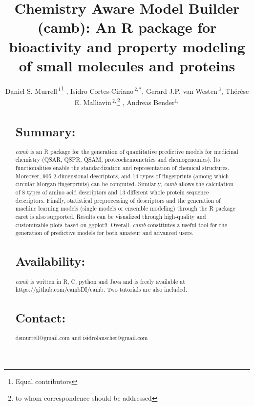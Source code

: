 \documentclass{bioinfo}
\begin{document}

\title{Chemistry Aware Model Builder (camb): An R package for bioactivity and property modeling of small molecules and proteins}
\author[Murrell \& Cortes-Ciriano \it{et~al}]{Daniel S. Murrell\,$^{1}$\footnote{Equal contributors} , Isidro Cortes-Ciriano\,$^{2,*}$, Gerard J.P. van Westen\,$^{3}$, Th\'er\`ese E. Malliavin\,$^{2,}$\footnote{to whom correspondence should be addressed} , Andreas Bender$^{1,}$\dag}
\address{$^{1}$Unilever Centre for Molecular Science Informatics, Department of Chemistry, University of Cambridge, Cambridge, United Kingdom.\\
$^{2}$Unite de Bioinformatique Structurale, Institut Pasteur and CNRS UMR 3825, Structural Biology and Chemistry Department, 25, rue Dr. Roux, 75 724 Paris, France.\\
$^{3}$European Molecular Biology Laboratory European Bioinformatics Institute Wellcome Trust Genome Campus, Hinxton, United Kingdom.}

\maketitle

\begin{abstract}
\section{Summary:}
{\it camb} is an R package for the generation of quantitative predictive models
for medicinal chemistry (QSAR, QSPR, QSAM, proteochemometrics and chemogenomics). 
Its functionalities enable the standardization and representation of chemical structures.
Moreover, 905 2-dimensional descriptors, and 14 types of fingerprints (among which circular Morgan 
fingerprints) can be computed. 
Similarly, {\it camb} allows the calculation of 8 types of amino acid descriptors and 13 different whole protein sequence descriptors.
Finally, statistical preprocessing of descriptors and the generation of machine learning models (single models or ensemble modeling) through
the R package caret is also supported.
Results can be visualized through high-quality and customizable plots based on ggplot2. 
Overall, {\it camb} constitutes a useful tool for the generation of predictive models 
for both amateur and advanced users.\\
\section{Availability:} {\it camb} is written in R, C, python and Java and is freely available
at https://github.com/cambDI/camb.
Two tutorials are also included.\\
\section{Contact:} dsmurrell@gmail.com and isidrolauscher@gmail.com
\end{abstract}
\end{document}
